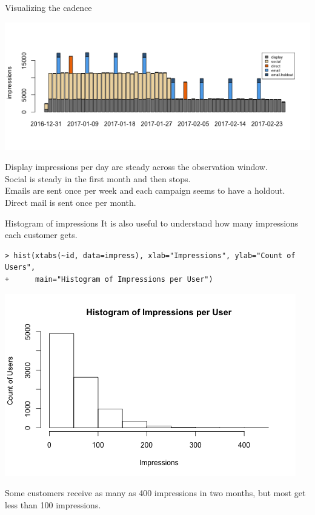 \documentclass[10pt, aspectratio=169]{beamer}
\begin{document}
\begin{frame}{Visualizing the cadence}
\begin{center}
\includegraphics[width=.85\textwidth]{images/cadence.png}
\end{center}
\alert{Display impressions per day are steady across the observation window. \\
Social is steady in the first month and then stops. \\
Emails are sent once per week and each campaign seems to have a holdout.  \\
Direct mail is sent once per month.}
\end{frame}

\begin{frame}[fragile]{Histogram of impressions}
It is also useful to understand how many impressions each customer gets. 
\begin{lstlisting}
> hist(xtabs(~id, data=impress), xlab="Impressions", ylab="Count of Users",
+      main="Histogram of Impressions per User")
\end{lstlisting}
\begin{center}
\includegraphics[height=.5\textheight]{images/histimpressions.png}
\end{center}
\alert{Some customers receive as many as 400 impressions in two months, but most get less than 100 impressions.}
\end{frame}
\end{document}
